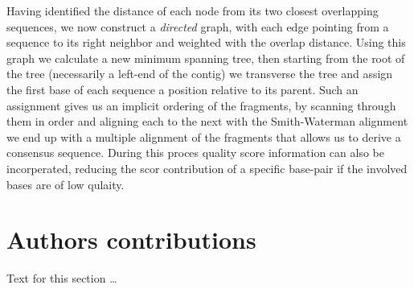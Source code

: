 \documentclass[10pt]{bmc_article}
\newenvironment{bmcformat}{\begin{raggedright}\baselineskip20pt\sloppy\setboolean{publ}{false}}{\end{raggedright}\baselineskip20pt\sloppy}
\begin{document}
\begin{bmcformat}
\vspace{3mm}

Having identified the distance of each node from its two closest
overlapping sequences, we now construct a {\it directed} graph, with
each edge pointing from a sequence to its right neighbor and weighted
with the overlap distance.  Using this graph we calculate a new
minimum spanning tree, then starting from the root of the tree
(necessarily a left-end of the contig) we transverse the tree and
assign the first base of each sequence a position relative to its
parent.  Such an assignment gives us an implicit ordering of the
fragments, by scanning through them in order and aligning each to
the next with the Smith-Waterman alignment we end up with a multiple
alignment of the fragments that allows us to derive a consensus
sequence.  During this proces quality score information can also be
incorperated, reducing the scor contribution of a specific base-pair
if the involved bases are of low qulaity.












    
\section*{Authors contributions}
    Text for this section \ldots


\end{bmcformat}
\end{document}
